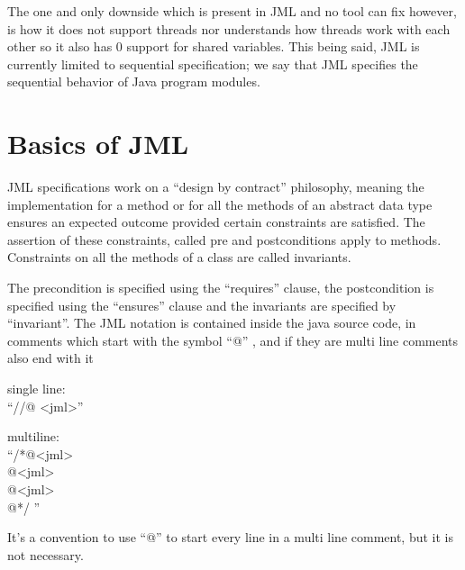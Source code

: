 \documentclass{article}
\begin{document}
The one and only downside which is present in JML and no tool can fix however, is how it does not support threads nor understands how threads work with each other so it also has 0 support for shared variables. This being said, \cite{leavens2008jml} JML is currently limited to sequential specification; we say that JML specifies the sequential behavior of Java program modules.


\section{Basics of JML}
JML specifications work on a “design by contract” philosophy, meaning the implementation for a method or for all the methods of an abstract data type ensures an expected outcome provided certain constraints are satisfied. 
The assertion of these constraints, called pre and postconditions apply to methods. Constraints on all the methods of a class are called invariants. 

The precondition is specified using the “requires” clause, the postcondition is specified using the “ensures” clause and the invariants are specified by “invariant”.
	The JML notation is contained inside the java source code, in comments which start with the symbol “@” ,  and if they are multi line comments also end with it

\begin{multicols}{2}
\titlespacing*{\subsection}
  {0pt}{4\baselineskip}{1.5\baselineskip}


\bigskip \bigskip
\begin{center}
single line:\\
“//@ <jml>”\\ 

\vspace{25pt}

multiline:\\
\hspace{0pt}“/*@<jml>\\
\hspace{12pt}@<jml>\\ 
\hspace{12pt}@<jml>\\
\hspace{0pt}@*/    ”\\
\end{center}
\end{multicols}   
It's a convention to use “@” to start every line in a multi line comment, but it is not necessary.
\end{document}
